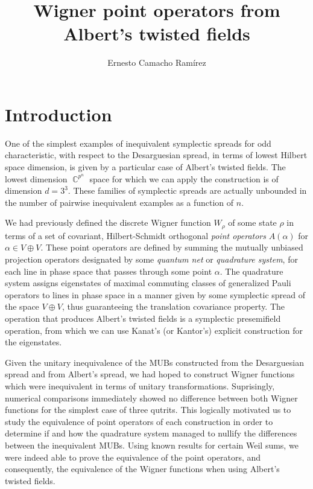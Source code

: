\documentclass[a4paper, 11pt]{article}
\title{Wigner point operators from Albert's twisted fields}
\author{Ernesto Camacho Ramírez}
\DeclareMathOperator{\C}{\mathbb{C}}
\begin{document}
  \maketitle

  \section{Introduction}

  One of the simplest examples of inequivalent symplectic
  spreads for odd characteristic, with respect to the
  Desarguesian spread, in terms of lowest Hilbert space
  dimension, is given by a particular case of Albert's
  twisted fields.  The lowest dimension $\C^{p^{n}}$ space
  for which we can apply the construction is of dimension $d
  = 3^{3}$. These families of symplectic spreads are
  actually unbounded in the number of pairwise inequivalent
  examples as a function of $n$.

  We had previously defined the discrete Wigner function
  $W_\rho$ of some state $\rho$ in terms of a set of
  covariant, Hilbert-Schmidt orthogonal \textit{point
  operators} $A(\alpha)$ for $\alpha \in V \oplus V$. These
  point operators are defined by summing the mutually
  unbiased projection operators designated by some
  \textit{quantum net} or \textit{quadrature system}, for
  each line in phase space that passes through some point
  $\alpha$. The quadrature system assigns eigenstates of
  maximal commuting classes of generalized Pauli operators
  to lines in phase space in a manner given by some
  symplectic spread of the space $V \oplus V$, thus
  guaranteeing the translation covariance property. The
  operation that produces Albert's twisted fields is a
  symplectic presemifield operation, from which we can use
  Kanat's (or Kantor's) explicit construction for the
  eigenstates.

  Given the unitary inequivalence of the MUBs constructed
  from the Desarguesian spread and from Albert's spread, we
  had hoped to construct Wigner functions which were
  inequivalent in terms of unitary transformations.
  Suprisingly, numerical comparisons immediately showed no
  difference between both Wigner functions for the simplest
  case of three qutrits. This logically motivated us to
  study the equivalence of point operators of each
  construction in order to determine if and how the
  quadrature system managed to nullify the differences
  between the inequivalent MUBs. Using known results for
  certain Weil sums, we were indeed able to prove the
  equivalence of the point operators, and consequently, the
  equivalence of the Wigner functions when using Albert's
  twisted fields.
\end{document}
